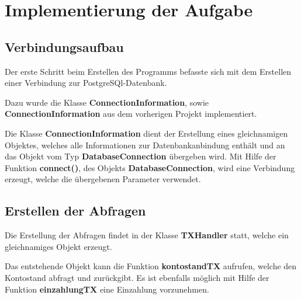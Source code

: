 \section{Implementierung der Aufgabe}

\subsection{Verbindungsaufbau}
Der erste Schritt beim Erstellen des Programms befasste sich mit dem Erstellen
einer Verbindung zur PostgreSQl-Datenbank. 

Dazu wurde die Klasse \textbf{ConnectionInformation}, sowie
\textbf{ConnectionInformation} aus dem vorherigen Projekt implementiert. 

Die Klasse \textbf{ConnectionInformation} dient der Erstellung eines gleichnamigen
Objektes, welches alle Informationen zur Datenbankanbindung enthält und an das
Objekt vom Typ \textbf{DatabaseConnection} übergeben wird. Mit Hilfe der Funktion
\textbf{connect()}, des Objekts \textbf{DatabaseConnection}, wird eine Verbindung
erzeugt, welche die übergebenen Parameter verwendet.

\subsection{Erstellen der Abfragen}
Die Erstellung der Abfragen findet in der Klasse \textbf{TXHandler} statt, welche
ein gleichnamiges Objekt erzeugt. 

Das entstehende Objekt kann die Funktion \textbf{kontostandTX} aufrufen, welche
den Kontostand abfragt und zurückgibt. Es ist ebenfalls möglich mit Hilfe der
Funktion \textbf{einzahlungTX} eine Einzahlung vorzunehmen. 

